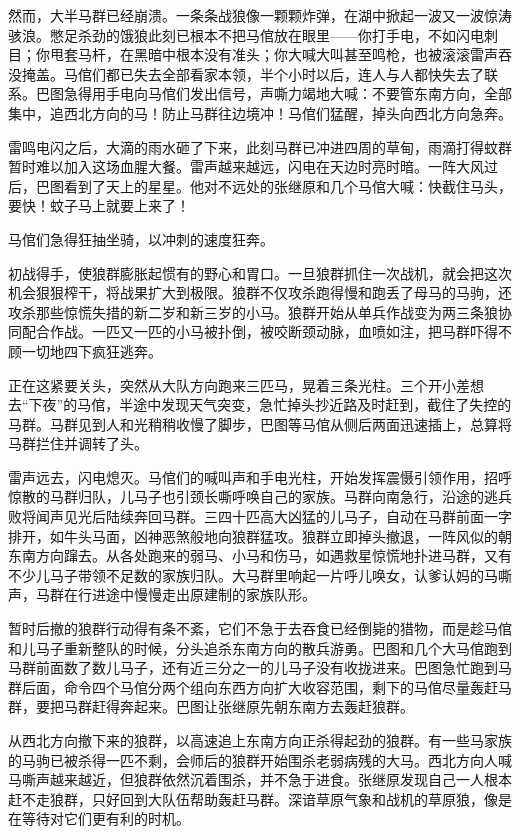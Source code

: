 \par 然而，大半马群已经崩溃。一条条战狼像一颗颗炸弹，在湖中掀起一波又一波惊涛骇浪。憋足杀劲的饿狼此刻已根本不把马倌放在眼里——你打手电，不如闪电刺目；你甩套马杆，在黑暗中根本没有准头；你大喊大叫甚至鸣枪，也被滚滚雷声吞没掩盖。马倌们都已失去全部看家本领，半个小时以后，连人与人都快失去了联系。巴图急得用手电向马倌们发出信号，声嘶力竭地大喊：不要管东南方向，全部集中，追西北方向的马！防止马群往边境冲！马倌们猛醒，掉头向西北方向急奔。
\par 雷鸣电闪之后，大滴的雨水砸了下来，此刻马群已冲进四周的草甸，雨滴打得蚊群暂时难以加入这场血腥大餐。雷声越来越远，闪电在天边时亮时暗。一阵大风过后，巴图看到了天上的星星。他对不远处的张继原和几个马倌大喊：快截住马头，要快！蚊子马上就要上来了！
\par 马倌们急得狂抽坐骑，以冲刺的速度狂奔。
\par 初战得手，使狼群膨胀起惯有的野心和胃口。一旦狼群抓住一次战机，就会把这次机会狠狠榨干，将战果扩大到极限。狼群不仅攻杀跑得慢和跑丢了母马的马驹，还攻杀那些惊慌失措的新二岁和新三岁的小马。狼群开始从单兵作战变为两三条狼协同配合作战。一匹又一匹的小马被扑倒，被咬断颈动脉，血喷如注，把马群吓得不顾一切地四下疯狂逃奔。
\par 正在这紧要关头，突然从大队方向跑来三匹马，晃着三条光柱。三个开小差想去“下夜”的马倌，半途中发现天气突变，急忙掉头抄近路及时赶到，截住了失控的马群。马群见到人和光稍稍收慢了脚步，巴图等马倌从侧后两面迅速插上，总算将马群拦住并调转了头。
\par 雷声远去，闪电熄灭。马倌们的喊叫声和手电光柱，开始发挥震慑引领作用，招呼惊散的马群归队，儿马子也引颈长嘶呼唤自己的家族。马群向南急行，沿途的逃兵败将闻声见光后陆续奔回马群。三四十匹高大凶猛的儿马子，自动在马群前面一字排开，如牛头马面，凶神恶煞般地向狼群猛攻。狼群立即掉头撤退，一阵风似的朝东南方向蹿去。从各处跑来的弱马、小马和伤马，如遇救星惊慌地扑进马群，又有不少儿马子带领不足数的家族归队。大马群里响起一片呼儿唤女，认爹认妈的马嘶声，马群在行进途中慢慢走出原建制的家族队形。
\par 暂时后撤的狼群行动得有条不紊，它们不急于去吞食已经倒毙的猎物，而是趁马倌和儿马子重新整队的时候，分头追杀东南方向的散兵游勇。巴图和几个大马倌跑到马群前面数了数儿马子，还有近三分之一的儿马子没有收拢进来。巴图急忙跑到马群后面，命令四个马倌分两个组向东西方向扩大收容范围，剩下的马倌尽量轰赶马群，要把马群赶得奔起来。巴图让张继原先朝东南方去轰赶狼群。
\par 从西北方向撤下来的狼群，以高速追上东南方向正杀得起劲的狼群。有一些马家族的马驹已被杀得一匹不剩，会师后的狼群开始围杀老弱病残的大马。西北方向人喊马嘶声越来越近，但狼群依然沉着围杀，并不急于进食。张继原发现自己一人根本赶不走狼群，只好回到大队伍帮助轰赶马群。深谙草原气象和战机的草原狼，像是在等待对它们更有利的时机。
